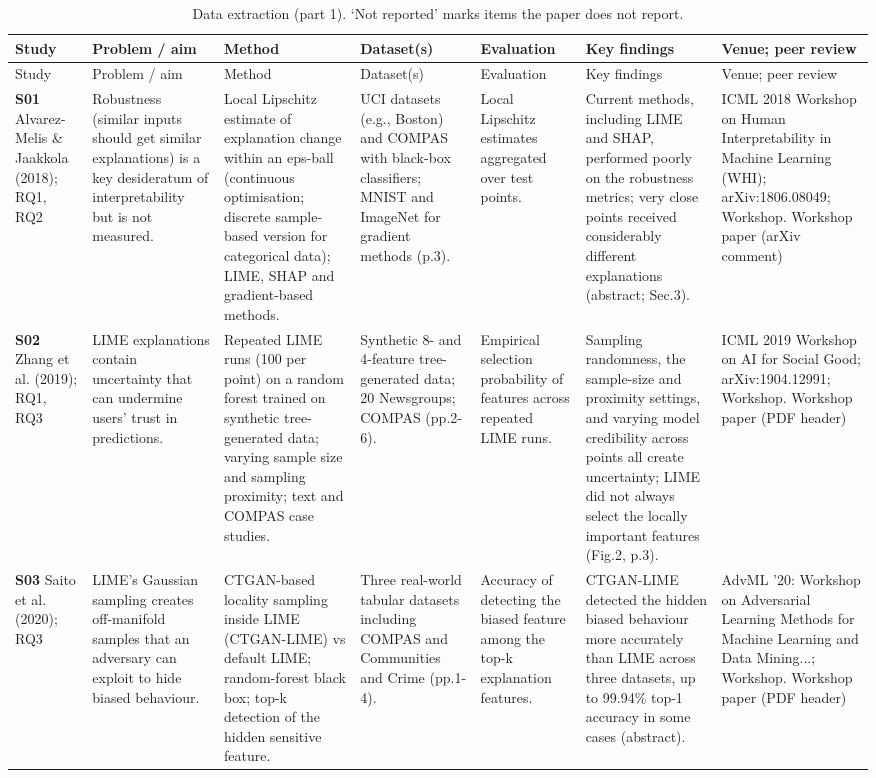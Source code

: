 \begin{longtable}{@{}P{1.55cm}P{2.9cm}P{4.5cm}P{3.2cm}P{3.4cm}P{4.6cm}P{3.6cm}@{}}
\caption{Data extraction (part 1). `Not reported' marks items the paper does not report.}\label{tab:ext1}\\
\toprule Study & Problem / aim & Method & Dataset(s) & Evaluation & Key findings & Venue; peer review \\ \midrule \endfirsthead
\toprule Study & Problem / aim & Method & Dataset(s) & Evaluation & Key findings & Venue; peer review \\ \midrule \endhead
\bottomrule \endfoot
\textbf{S01} \cite{S01} Alvarez-Melis \& Jaakkola (2018); RQ1, RQ2 & Robustness (similar inputs should get similar explanations) is a key desideratum of interpretability but is not measured. & Local Lipschitz estimate of explanation change within an eps-ball (continuous optimisation; discrete sample-based version for categorical data); LIME, SHAP and gradient-based methods. & UCI datasets (e.g., Boston) and COMPAS with black-box classifiers; MNIST and ImageNet for gradient methods (p.3). & Local Lipschitz estimates aggregated over test points. & Current methods, including LIME and SHAP, performed poorly on the robustness metrics; very close points received considerably different explanations (abstract; Sec.3). & ICML 2018 Workshop on Human Interpretability in Machine Learning (WHI); arXiv:1806.08049; Workshop. Workshop paper (arXiv comment) \\
\textbf{S02} \cite{S02} Zhang et al. (2019); RQ1, RQ3 & LIME explanations contain uncertainty that can undermine users' trust in predictions. & Repeated LIME runs (100 per point) on a random forest trained on synthetic tree-generated data; varying sample size and sampling proximity; text and COMPAS case studies. & Synthetic 8- and 4-feature tree-generated data; 20 Newsgroups; COMPAS (pp.2-6). & Empirical selection probability of features across repeated LIME runs. & Sampling randomness, the sample-size and proximity settings, and varying model credibility across points all create uncertainty; LIME did not always select the locally important features (Fig.2, p.3). & ICML 2019 Workshop on AI for Social Good; arXiv:1904.12991; Workshop. Workshop paper (PDF header) \\
\textbf{S03} \cite{S03} Saito et al. (2020); RQ3 & LIME's Gaussian sampling creates off-manifold samples that an adversary can exploit to hide biased behaviour. & CTGAN-based locality sampling inside LIME (CTGAN-LIME) vs default LIME; random-forest black box; top-k detection of the hidden sensitive feature. & Three real-world tabular datasets including COMPAS and Communities and Crime (pp.1-4). & Accuracy of detecting the biased feature among the top-k explanation features. & CTGAN-LIME detected the hidden biased behaviour more accurately than LIME across three datasets, up to 99.94\% top-1 accuracy in some cases (abstract). & AdvML '20: Workshop on Adversarial Learning Methods for Machine Learning and Data Mining...; Workshop. Workshop paper (PDF header) \\

\end{longtable}
